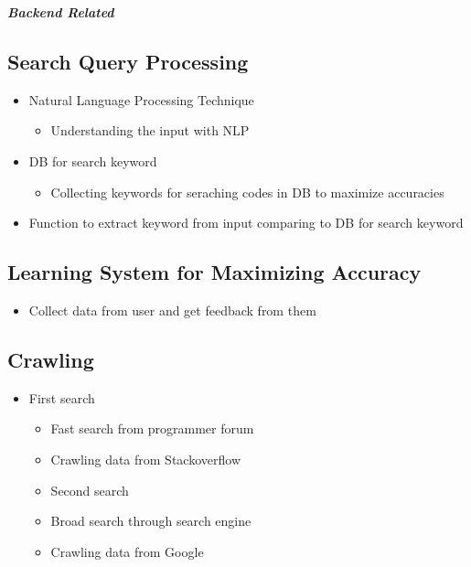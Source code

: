 \documentclass[conference]{IEEEtran}
\begin{document}
\textit{\textbf{Backend Related}}
\textit{ }

\subsection{Search Query Processing}
\begin{itemize}
  \item Natural Language Processing Technique
  \begin{itemize}
    \item Understanding the input with NLP
  \end{itemize}
  \item DB for search keyword
  \begin{itemize}
    \item Collecting keywords for seraching codes in DB to maximize accuracies
  \end{itemize}
  \item Function to extract keyword from input comparing to DB for search keyword
\end{itemize}
\textit{ }


\subsection{Learning System for Maximizing Accuracy}
\begin{itemize}
  \item Collect data from user and get feedback from them
\end{itemize}
\textit{ }


\subsection{Crawling}
\begin{itemize}
  \item First search
  \begin{itemize}
    \item Fast search from programmer forum
    \item Crawling data from Stackoverflow
    \item Second search
  \end{itemize}
  \begin{itemize}
    \item Broad search through search engine
    \item Crawling data from Google
  \end{itemize}
\end{itemize}
\textit{ }
\end{document}
